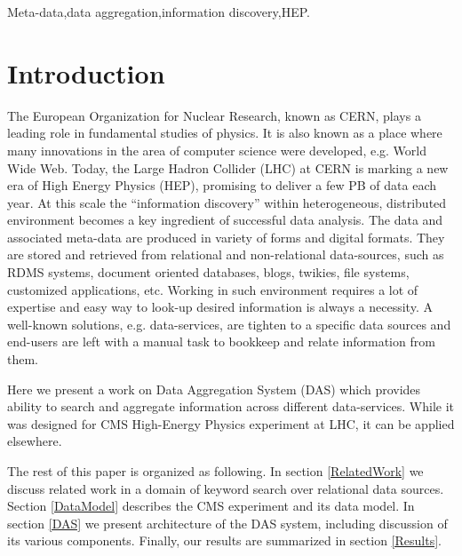 \documentclass[1p,times]{elsarticle}
\begin{document}
\begin{frontmatter}
\begin{keyword}
Meta-data\sep data aggregation\sep information discovery\sep HEP.


\end{keyword}

\end{frontmatter}


\section{Introduction}
The European Organization for Nuclear Research, known as CERN, plays a leading
role in fundamental studies of physics. It is also known as a place where
many innovations in the area of computer science were developed, e.g. World Wide Web.
Today, the Large Hadron Collider (LHC) at CERN is marking a new era of High Energy
Physics (HEP), promising to deliver a few PB of data each year. 
At this scale the ``information discovery'' within heterogeneous, distributed 
environment becomes a key ingredient of successful data analysis.
The data and associated meta-data are produced in variety of forms and digital formats.
They are stored and retrieved from relational and non-relational data-sources, such as 
RDMS systems, document oriented databases, blogs, twikies, file systems,
customized applications, etc. Working in such environment requires a lot 
of expertise and easy way to look-up desired information is always a necessity.
A well-known solutions, e.g. data-services, are tighten to a specific data 
sources and end-users are left with a manual task to bookkeep and 
relate information from them.

Here we present a work on Data Aggregation System (DAS) which provides
ability to search and aggregate information across different 
data-services. While it was designed for CMS High-Energy Physics 
experiment at LHC, it can be applied elsewhere. 

The rest of this paper is organized as following. 
In section \ref{RelatedWork} we discuss related work in a domain of 
keyword search over relational data sources.
Section \ref{DataModel} describes the CMS experiment and its data model. In section
\ref{DAS} we present architecture of the DAS system, including discussion of its
various components. Finally, our results are summarized in section \ref{Results}.
\end{document}
